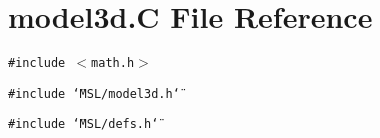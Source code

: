 \section{model3d.C File Reference}
\label{model3d_8C}
{\tt \#include $<$math.h$>$}\par
{\tt \#include \char`\"{}MSL/model3d.h\char`\"{}}\par
{\tt \#include \char`\"{}MSL/defs.h\char`\"{}}\par
